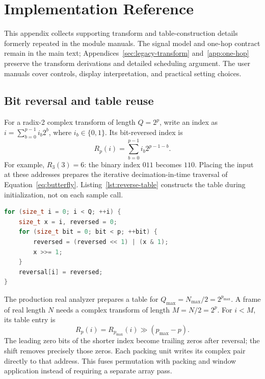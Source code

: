 \section{Implementation Reference}
\label{app:implementation}
This appendix collects supporting transform and table-construction details
formerly repeated in the module manuals. The signal model and one-hop contract
remain in the main text;
Appendices~\ref{sec:legacy-transform} and~\ref{app:one-hop} preserve the
transform derivations and detailed scheduling argument. The user manuals
cover controls, display interpretation, and practical setting choices.

\subsection{Bit reversal and table reuse}
For a radix-2 complex transform of length $Q=2^p$, write an index as
$i=\sum_{b=0}^{p-1}i_b2^b$, where $i_b\in\{0,1\}$. Its bit-reversed index is
\begin{equation}
 R_p(i)=\sum_{b=0}^{p-1}i_b2^{p-1-b}.
 \label{eq:reverse-index}
\end{equation}
For example, $R_3(3)=6$: the binary index $011$ becomes $110$. Placing the
input at these addresses prepares the iterative decimation-in-time traversal
of Equation~\eqref{eq:butterfly}. Listing~\ref{lst:reverse-table} constructs
the table during initialization, not on each sample call.

\begin{lstlisting}[float=tbp,language=C++,caption={Reference construction of a bit-reversal table for $Q=2^p$.},label={lst:reverse-table}]
for (size_t i = 0; i < Q; ++i) {
    size_t x = i, reversed = 0;
    for (size_t bit = 0; bit < p; ++bit) {
        reversed = (reversed << 1) | (x & 1);
        x >>= 1;
    }
    reversal[i] = reversed;
}
\end{lstlisting}

The production real analyzer prepares a table for
$Q_{\max}=N_{\max}/2=2^{p_{\max}}$. A frame of real length $N$ needs a
complex transform of length $M=N/2=2^p$. For $i<M$, its table entry is
\begin{equation}
 R_p(i)=R_{p_{\max}}(i)\mathbin{\gg}(p_{\max}-p).
 \label{eq:reverse-reuse}
\end{equation}
The leading zero bits of the shorter index become trailing zeros after
reversal; the shift removes precisely those zeros. Each packing unit writes
its complex pair directly to that address. This fuses permutation with
packing and window application instead of requiring a separate array pass.

